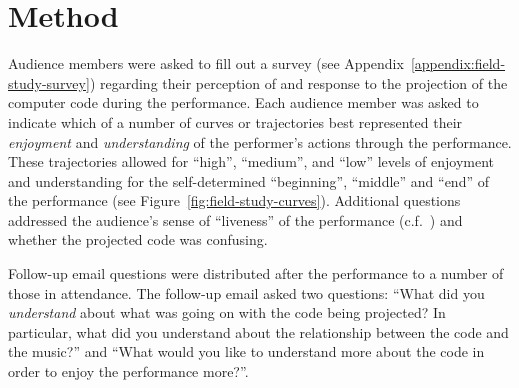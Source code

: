 \section{Method}

Audience members were asked to fill out a survey (see Appendix~\ref{appendix:field-study-survey}) regarding their perception of and response to the projection of the computer code during the performance. Each audience member was asked to indicate which of a number of curves or trajectories best represented their \emph{enjoyment} and \emph{understanding} of the performer's actions through the performance. These trajectories allowed for ``high'', ``medium'', and ``low'' levels of enjoyment and understanding for the self-determined ``beginning'', ``middle'' and ``end'' of the performance (see Figure~\ref{fig:field-study-curves}). Additional questions addressed the audience's sense of ``liveness'' of the performance (c.f.~\cite{Auslander}) and whether the projected code was confusing.

Follow-up email questions were distributed after the performance to a number of those in attendance. The follow-up email asked two questions: ``What did you \emph{understand} about what was going on with the code being projected? In particular, what did you understand about the relationship between the code and the music?'' and ``What would you like to understand more about the code in order to enjoy the performance more?''.

